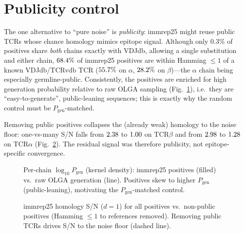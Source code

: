 \section{Publicity control}\label{sec:publicity}

The one alternative to ``pure noise'' is \emph{publicity}: immrep25 might reuse
public TCRs whose chance homology mimics epitope signal. Although only $0.3\%$ of
positives share \emph{both} chains exactly with VDJdb, allowing a single
substitution and either chain, $68.4\%$ of immrep25 positives are within
Hamming $\le 1$ of a known VDJdb/TCRvdb TCR ($55.7\%$ on $\alpha$, $28.2\%$ on
$\beta$)---the $\alpha$ chain being especially germline-public. Consistently, the
positives are enriched for high generation probability relative to raw OLGA
sampling (Fig.~\ref{fig:pgen}), i.e.\ they are ``easy-to-generate'', public-leaning
sequences; this is exactly why the random control must be $P_{\text{gen}}$-matched.

Removing public positives collapses the (already weak) homology to the noise floor:
one-vs-many S/N falls from $2.38$ to $1.00$ on TCR$\beta$ and from $2.98$ to
$1.28$ on TCR$\alpha$ (Fig.~\ref{fig:pub}). The residual signal was therefore
publicity, not epitope-specific convergence.

\begin{figure}[h]\centering

\caption{Per-chain $\log_{10}P_{\text{gen}}$ (kernel density): immrep25 positives
(filled) vs.\ raw OLGA generation (line). Positives skew to higher $P_{\text{gen}}$
(public-leaning), motivating the $P_{\text{gen}}$-matched control.}
\label{fig:pgen}
\end{figure}

\begin{figure}[h]\centering

\caption{immrep25 homology S/N ($d{=}1$) for all positives vs.\ non-public
positives (Hamming $\le 1$ to references removed). Removing public TCRs drives S/N
to the noise floor (dashed line).}
\label{fig:pub}
\end{figure}
